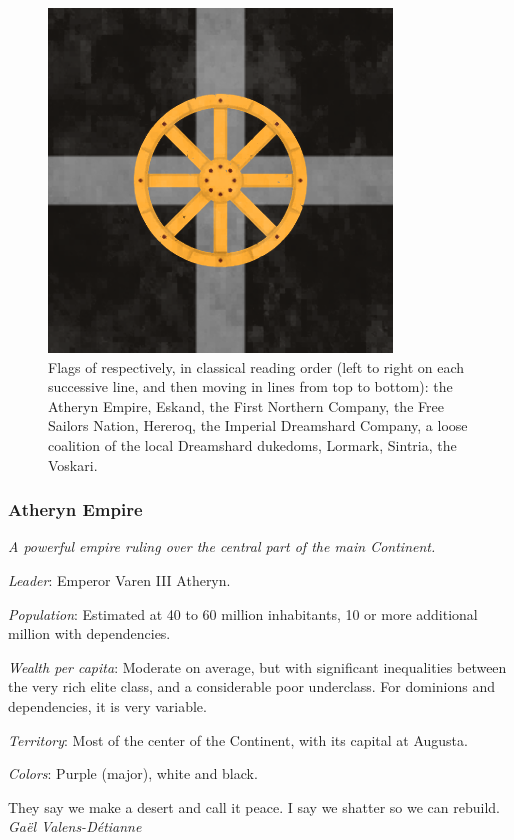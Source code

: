 \begin{figure}[!ht]
        \includegraphics[scale=0.25]{img/flag/voskari.png}

    \caption{Flags of respectively, in classical reading order (left to right on each successive line, and then moving in lines from top to bottom): the Atheryn Empire, Eskand, the First Northern Company, the Free Sailors Nation, Hereroq, the Imperial Dreamshard Company, a loose coalition of the local Dreamshard dukedoms, Lormark, Sintria, the Voskari.}
    \label{flags}
\end{figure}





\subsubsection{Atheryn Empire}


\textit{A powerful empire ruling over the central part of the main Continent.}

\textit{Leader}: Emperor Varen III Atheryn.

\textit{Population}: Estimated at 40 to 60 million inhabitants, 10 or more additional million with dependencies.

\textit{Wealth per capita}: Moderate on average, but with significant inequalities between the very rich elite class, and a considerable poor underclass. For dominions and dependencies, it is very variable.

\textit{Territory}: Most of the center of the Continent, with its capital at Augusta.
    
\textit{Colors}: Purple (major), white and black.


\begin{rpg-quotebox}
They say we make a desert and call it peace. I say we shatter so we can rebuild. \\ \textendash \textit{Gaël Valens-Détianne}
\end{rpg-quotebox}

